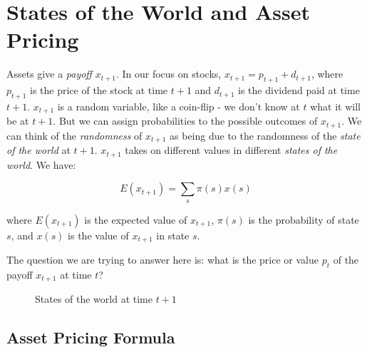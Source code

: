 \chapter{States of the World and Asset Pricing}

Assets give a \textit{payoff} $x_{t+1}$. In our focus on stocks, 
$x_{t+1} = p_{t+1} + d_{t+1}$, where $p_{t+1}$ is the 
price of the stock at time $t+1$ and $d_{t+1}$ 
is the dividend paid at time $t+1$.
$x_{t+1}$ is a random variable, like a coin-flip - we don't 
know at $t$ what it will be at $t+1$. But we can assign 
probabilities to the possible outcomes of $x_{t+1}$.
We can think of the \textit{randomness} of $x_{t+1}$ as being
due to the randomness of the \textit{state of the world} at $t+1$.
$x_{t+1}$ takes on different values in 
different \textit{states of the world}.
We have:

\begin{equation}
    E(x_{t+1}) = \sum_s \pi(s) x(s)
\end{equation}

where $E(x_{t+1})$ is the expected value of $x_{t+1}$,
$\pi(s)$ is the probability of state $s$, and $x(s)$ is the
value of $x_{t+1}$ in state $s$.

The question we are trying to answer here is: what is the price 
or value $p_t$ of the payoff $x_{t+1}$ at time $t$?

\begin{figure}[htbp]
    \centering
{}
    \caption{States of the world at time \(t+1\)}
    \label{fig:states_of_the_world}
\end{figure}

\section{Asset Pricing Formula}

